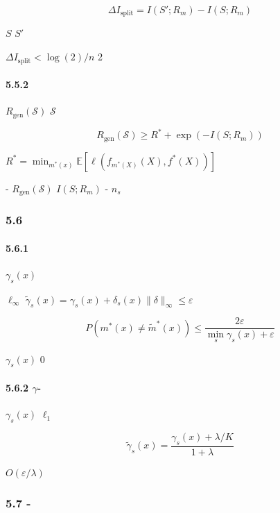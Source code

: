 \documentclass[
  12pt,
]{article}
\begin{document}
\[\Delta I_{\text{split}} = I(S'; R_m) - I(S; R_m)\]

 \(S\) \(S'\) 

 \(\Delta I_{\text{split}} < \log(2)/n\) 2


\paragraph{5.5.2
}\label{ux6700ux4f18ux72b6ux6001ux6570ux7684ux4fe1ux606fux8bbaux754c}

 \(R_{\text{gen}}(\mathcal{S})\)  \(\mathcal{S}\)


\[R_{\text{gen}}(\mathcal{S}) \geq R^* + \exp(-I(S; R_m))\]

 \(R^* = \min_{m^*(x)} \mathbb{E}[\ell(f_{m^*(X)}(X), f^*(X))]\)


 - 
\(R_{\text{gen}}(\mathcal{S})\) \(I(S; R_m)\) -
 \(n_s\)

\subsubsection{5.6
}\label{ux5bf9ux6297ux9c81ux68d2ux6027ux8fb9ux754c}

\paragraph{5.6.1
}\label{ux5bf9ux6297ux72b6ux6001ux6270ux52a8}


\(\gamma_s(x)\)

 \(\ell_\infty\)
\(\tilde{\gamma}_s(x) = \gamma_s(x) + \delta_s(x)\)\(\|\delta\|_\infty \leq \varepsilon\)

\[P(m^*(x) \neq \tilde{m}^*(x)) \leq \frac{2\varepsilon}{\min_{s} \gamma_s(x) + \varepsilon}\]

 \(\gamma_s(x)\)  0 

\paragraph{\texorpdfstring{5.6.2
\(\gamma\)-}{5.6.2 \textbackslash gamma-}}\label{ux9632ux5fa1gamma-ux5e73ux6ed1}

 \(\gamma_s(x)\)  \(\ell_1\) 

\[\tilde{\gamma}_s(x) = \frac{\gamma_s(x) + \lambda/K}{1 + \lambda}\]

 \(O(\varepsilon/\lambda)\)

\subsubsection{5.7
-}\label{ux8ba1ux7b97-ux7edfux8ba1ux6298ux8877}
\end{document}

